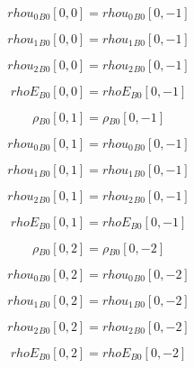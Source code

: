 \documentclass{article}
\begin{document}
\begin{dmath}{rhou_{0}{_{B0}}}[{0,0}] = {rhou_{0}{_{B0}}}[{0,-1}]\end{dmath}

\begin{dmath}{rhou_{1}{_{B0}}}[{0,0}] = {rhou_{1}{_{B0}}}[{0,-1}]\end{dmath}

\begin{dmath}{rhou_{2}{_{B0}}}[{0,0}] = {rhou_{2}{_{B0}}}[{0,-1}]\end{dmath}

\begin{dmath}{rhoE{_{B0}}}[{0,0}] = {rhoE{_{B0}}}[{0,-1}]\end{dmath}

\begin{dmath}{\rho{_{B0}}}[{0,1}] = {\rho{_{B0}}}[{0,-1}]\end{dmath}

\begin{dmath}{rhou_{0}{_{B0}}}[{0,1}] = {rhou_{0}{_{B0}}}[{0,-1}]\end{dmath}

\begin{dmath}{rhou_{1}{_{B0}}}[{0,1}] = {rhou_{1}{_{B0}}}[{0,-1}]\end{dmath}

\begin{dmath}{rhou_{2}{_{B0}}}[{0,1}] = {rhou_{2}{_{B0}}}[{0,-1}]\end{dmath}

\begin{dmath}{rhoE{_{B0}}}[{0,1}] = {rhoE{_{B0}}}[{0,-1}]\end{dmath}

\begin{dmath}{\rho{_{B0}}}[{0,2}] = {\rho{_{B0}}}[{0,-2}]\end{dmath}

\begin{dmath}{rhou_{0}{_{B0}}}[{0,2}] = {rhou_{0}{_{B0}}}[{0,-2}]\end{dmath}

\begin{dmath}{rhou_{1}{_{B0}}}[{0,2}] = {rhou_{1}{_{B0}}}[{0,-2}]\end{dmath}

\begin{dmath}{rhou_{2}{_{B0}}}[{0,2}] = {rhou_{2}{_{B0}}}[{0,-2}]\end{dmath}

\begin{dmath}{rhoE{_{B0}}}[{0,2}] = {rhoE{_{B0}}}[{0,-2}]\end{dmath}
\end{document}
